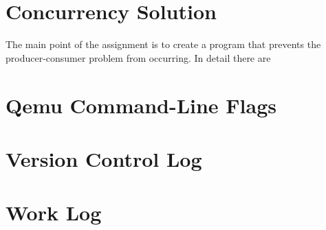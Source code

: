 \documentclass[draftclsnofoot,onecolumn,10pt,compsoc]{IEEEtran}
\begin{document}
\section{Concurrency Solution}
The main point of the assignment is to create a program that prevents the
producer-consumer problem from occurring. In detail there are 
\section{Qemu Command-Line Flags}
\section{Version Control Log}
\section{Work Log}
\end{document}
